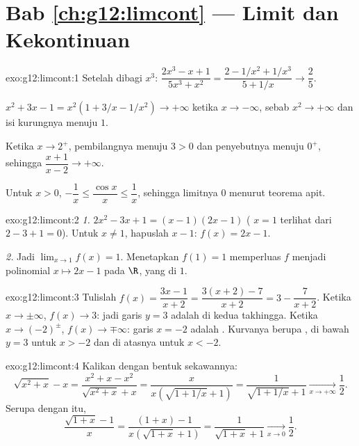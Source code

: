 \section*{Bab \ref{ch:g12:limcont} --- Limit dan Kekontinuan}

\begin{solution}{exo:g12:limcont:1}
Setelah dibagi $x^3$:
$\dfrac{2x^3 - x + 1}{5x^3 + x^2} = \dfrac{2 - 1/x^2 + 1/x^3}{5 + 1/x}
\to \dfrac{2}{5}$.

$x^2 + 3x - 1 = x^2(1 + 3/x - 1/x^2) \to +\infty$ ketika $x \to -\infty$, sebab
$x^2 \to +\infty$ dan isi kurungnya menuju $1$.

Ketika $x \to 2^+$, pembilangnya menuju $3 > 0$ dan penyebutnya menuju $0^+$,
sehingga $\dfrac{x+1}{x-2} \to +\infty$.

Untuk $x > 0$, $-\dfrac1x \leq \dfrac{\cos x}{x} \leq \dfrac1x$, sehingga
limitnya $0$ menurut teorema apit.
\end{solution}

\begin{solution}{exo:g12:limcont:2}
\emph{1.} $2x^2 - 3x + 1 = (x-1)(2x-1)$ ( $x=1$ terlihat dari
$2 - 3 + 1 = 0$). Untuk $x \neq 1$, hapuslah $x - 1$: $f(x) = 2x - 1$.

\emph{2.} Jadi $\lim_{x\to1} f(x) = 1$. Menetapkan $f(1) = 1$ memperluas $f$
menjadi  polinomial $x \mapsto 2x-1$ pada $\R$, yang  di $1$.
\end{solution}

\begin{solution}{exo:g12:limcont:3}
Tulislah $f(x) = \dfrac{3x - 1}{x + 2} = \dfrac{3(x+2) - 7}{x+2}
= 3 - \dfrac{7}{x+2}$. Ketika $x \to \pm\infty$, $f(x) \to 3$: jadi garis
$y = 3$ adalah  di kedua takhingga. Ketika $x \to (-2)^\pm$,
$f(x) \to \mp\infty$: garis $x = -2$ adalah . Kurvanya berupa
, di bawah $y=3$ untuk $x > -2$ dan di atasnya untuk $x < -2$.
\end{solution}

\begin{solution}{exo:g12:limcont:4}
Kalikan dengan bentuk sekawannya:
\[
\sqrt{x^2 + x} - x = \frac{x^2 + x - x^2}{\sqrt{x^2+x} + x}
= \frac{x}{x\left(\sqrt{1 + 1/x} + 1\right)}
= \frac{1}{\sqrt{1 + 1/x} + 1}
\xrightarrow[x\to+\infty]{} \frac{1}{2}.
\]
Serupa dengan itu,
\[
\frac{\sqrt{1+x} - 1}{x} = \frac{(1+x) - 1}{x\left(\sqrt{1+x} + 1\right)}
= \frac{1}{\sqrt{1+x} + 1} \xrightarrow[x\to0]{} \frac{1}{2}.
\]
\end{solution}

